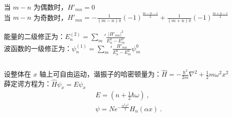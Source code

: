 当 $m-n$ 为偶数时，$H'_{mn}=0$ \\

当 $m-n$ 为奇数时，$\displaystyle H'_{mn} = -\frac{1}{(m-n)\pi}(-1)^{\frac{m-n-1}{2}}+\frac{1}{(m+n)\pi}(-1)^{\frac{m+n-1}{2}} $

能量的二级修正为：$\displaystyle E^{(2)}_{n}= \sum_{m}' \frac{\lvert H'_{mn}\rvert ^{2}}{E^0_{n}-E^0_{m}} $ \\

波函数的一级修正为：$\displaystyle \psi^{(1)}_{n}= \sum_{m}' \frac{H'_{mn}}{E^0_{n}-E^0_{m}} \psi^{0}_{m} $
\subsection{ }
设整体在 $x$ 轴上可自由运动，谐振子的哈密顿量为：$\displaystyle \hat{H} = -\frac{\hbar^{2}}{2m} \nabla^{2}+\frac{1}{2}m\omega^{2}x^{2} $ \\

薛定谔方程为：$\hat{H}\psi_{x} = E\psi_{x}$ \\
\begin{equation}
\begin{aligned}
& E=(n+\frac{1}{2} \hbar \omega)~, \\
& \psi = Ne^{-\frac{\alpha^{2}x^{2}}{2}}H_{n}(\alpha x)~.
\end{aligned}
\end{equation}

